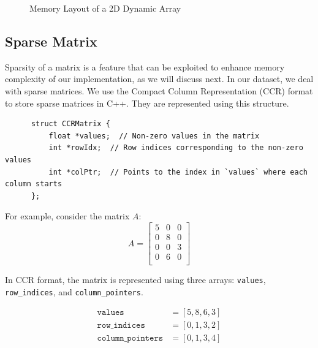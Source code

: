 \begin{figure}[h]
    \centering
    \caption{Memory Layout of a 2D Dynamic Array}
\end{figure}


\subsection{Sparse Matrix}\label{subsubsection:sparse-matrix}
Sparsity of a matrix is a feature that can be exploited to
enhance memory complexity of our implementation, as we will discuss next.
In our dataset, we deal with sparse matrices.
We use the Compact Column Representation (CCR) format to store sparse matrices in C++. They are represented using this
structure.

\begin{verbatim}
      struct CCRMatrix {
          float *values;  // Non-zero values in the matrix
          int *rowIdx;  // Row indices corresponding to the non-zero values
          int *colPtr;  // Points to the index in `values` where each column starts
      };
\end{verbatim}

For example, consider the matrix \( A \):
\[
    A =
    \begin{bmatrix}
        5 & 0 & 0 \\
        0 & 8 & 0 \\
        0 & 0 & 3 \\
        0 & 6 & 0 \\
    \end{bmatrix}
\]

In CCR format, the matrix is represented using three arrays:
\texttt{values}, \texttt{row\_indices}, and \texttt{column\_pointers}.

\begin{align*}
    \texttt{values}           & = [5, 8, 6, 3] \\
    \texttt{row\_indices}     & = [0, 1, 3, 2] \\
    \texttt{column\_pointers} & = [0, 1, 3, 4] \\
\end{align*}


